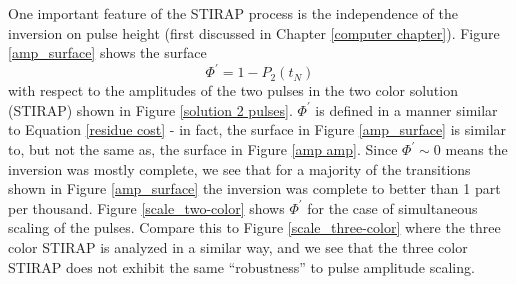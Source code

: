 
One important feature of the STIRAP process is the independence of the inversion on pulse height (first discussed in Chapter \ref{computer chapter}). Figure \ref{amp_surface} shows the surface
\begin{equation}
\Phi^{\prime}
=
1 - P_2(t_N)
\label{phi prime}
\end{equation}
with respect to the amplitudes of the two pulses in the two color solution (STIRAP) shown in Figure \ref{solution 2 pulses}. $\Phi^{\prime}$ is defined in a manner similar to Equation \ref{residue cost} - in fact, the surface in Figure \ref{amp_surface} is similar to, but not the same as, the surface in Figure \ref{amp amp}. Since $\Phi^{\prime}\sim0$ means the inversion was mostly complete, we see that for a majority of the transitions shown in Figure \ref{amp_surface} the inversion was complete to better than 1 part per thousand. Figure \ref{scale_two-color} shows $\Phi^{\prime}$ for the case of simultaneous scaling of the pulses. Compare this to Figure \ref{scale_three-color} where the three color STIRAP is analyzed in a similar way, and we see that the three color STIRAP does not exhibit the same ``robustness'' to pulse amplitude scaling.



